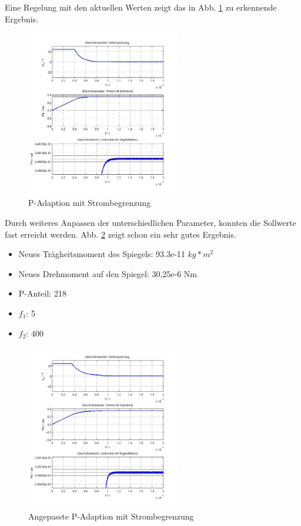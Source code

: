 Eine Regelung mit den aktuellen Werten zeigt das in Abb. \ref{fig:strombegrenztpad} zu erkennende Ergebnis.
\begin{figure}[!h]
	\centering
	\includegraphics[width=0.6\textwidth]{Strom-Pad-Neue-Werte-P320F1_2F2_160.jpg}
	\caption{P-Adaption mit Strombegrenzung}
	\label{fig:strombegrenztpad}
\end{figure}
Durch weiteres Anpassen der unterschiedlichen Parameter, konnten die Sollwerte fast erreicht werden. 
Abb. \ref{fig:strombegrenztpadfastsoll} zeigt schon ein sehr gutes Ergebnis.
\begin{itemize}
\item Neues Trägheitsmoment des Spiegels: 93.3e-11 $kg*m^2$
\item Neues Drehmoment auf den Spiegel: 30,25e-6 Nm
\item P-Anteil: 218
\item $f_1$: 5
\item $f_2$: 400
\end{itemize}
\begin{figure}[!h]
	\centering
	\includegraphics[width=0.6\textwidth]{Strom-Pad-Neue-Werte-P218F1_5F2_400.jpg}
	\caption{Angepasste P-Adaption mit Strombegrenzung}
	\label{fig:strombegrenztpadfastsoll}
\end{figure}


